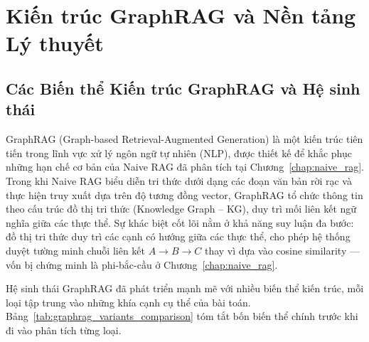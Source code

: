 \documentclass[12pt,a4paper]{report}
\theoremstyle{plain}
\theoremstyle{definition}
\begin{document}
	
	\chapter{Kiến trúc GraphRAG và Nền tảng Lý thuyết}
	\label{chap:graphrag_theory}
	
	
	\section{Các Biến thể Kiến trúc GraphRAG và Hệ sinh thái}
	\label{sec:graphrag_ecosystem}
	
	GraphRAG (Graph-based Retrieval-Augmented Generation) là một kiến trúc tiên
	tiến trong lĩnh vực xử lý ngôn ngữ tự nhiên (NLP), được thiết kế để khắc phục
	những hạn chế cơ bản của Naive RAG đã phân tích tại Chương~\ref{chap:naive_rag}.
	Trong khi Naive RAG biểu diễn tri thức dưới dạng các đoạn văn bản rời rạc và
	thực hiện truy xuất dựa trên độ tương đồng vector, GraphRAG tổ chức thông tin
	theo cấu trúc đồ thị tri thức (Knowledge Graph -- KG), duy trì mối liên kết ngữ
	nghĩa giữa các thực thể. Sự khác biệt cốt lõi nằm ở khả năng suy luận đa bước:
	đồ thị tri thức duy trì các cạnh có hướng giữa các thực thể, cho phép hệ thống
	duyệt tường minh chuỗi liên kết $A \to B \to C$ thay vì dựa vào cosine
	similarity --- vốn bị chứng minh là phi-bắc-cầu ở Chương~\ref{chap:naive_rag}.
	
	Hệ sinh thái GraphRAG đã phát triển mạnh mẽ với nhiều biến thể kiến trúc, mỗi
	loại tập trung vào những khía cạnh cụ thể của bài toán. Bảng~\ref{tab:graphrag_variants_comparison}
	tóm tắt bốn biến thể chính trước khi đi vào phân tích từng loại.
	
\end{document}
